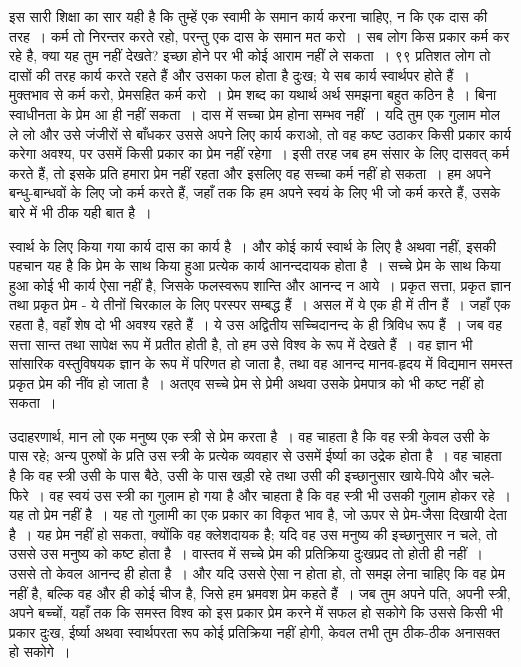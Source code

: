 इस सारी शिक्षा का सार यही है कि तुम्हें एक स्वामी के समान कार्य करना चाहिए, न कि एक दास की तरह~। कर्म तो निरन्तर करते रहो, परन्तु एक दास के समान मत करो~। सब लोग किस प्रकार कर्म कर रहे है, क्या यह तुम नहीं देखते? इच्छा होने पर भी कोई आराम नहीं ले सकता~। ९९ प्रतिशत लोग तो दासों की तरह कार्य करते रहते हैं और उसका फल होता है दुःख; ये सब कार्य स्वार्थपर होते हैं~। मुक्तभाव से कर्म करो, प्रेमसहित कर्म करो~। प्रेम शब्द का यथार्थ अर्थ समझना बहुत कठिन है~। बिना स्वाधीनता के प्रेम आ ही नहीं सकता~। दास में सच्चा प्रेम होना सम्भव नहीं~। यदि तुम एक गुलाम मोल ले लो और उसे जंजीरों से बाँधकर उससे अपने लिए कार्य कराओ, तो वह कष्ट उठाकर किसी प्रकार कार्य करेगा अवश्य, पर उसमें किसी प्रकार का प्रेम नहीं रहेगा~। इसी तरह जब हम संसार के लिए दासवत् कर्म करते हैं, तो इसके प्रति हमारा प्रेम नहीं रहता और इसलिए वह सच्चा कर्म नहीं हो सकता~। हम अपने बन्धु-बान्धवों के लिए जो कर्म करते हैं, जहाँ तक कि हम अपने स्वयं के लिए भी जो कर्म करते हैं, उसके बारे में भी ठीक यही बात है~।

स्वार्थ के लिए किया गया कार्य दास का कार्य है~। और कोई कार्य स्वार्थ के लिए है अथवा नहीं, इसकी पहचान यह है कि प्रेम के साथ किया हुआ प्रत्येक कार्य आनन्ददायक होता है~। सच्चे प्रेम के साथ किया हुआ कोई भी कार्य ऐसा नहीं है, जिसके फलस्वरूप शान्ति और आनन्द न आये~। प्रकृत सत्ता, प्रकृत ज्ञान तथा प्रकृत प्रेम - ये तीनों चिरकाल के लिए परस्पर सम्बद्ध हैं~। असल में ये एक ही में तीन हैं~। जहाँ एक रहता है, वहाँ शेष दो भी अवश्य रहते हैं~। ये उस अद्वितीय सच्चिदानन्द के ही त्रिविध रूप हैं~। जब वह सत्ता सान्त तथा सापेक्ष रूप में प्रतीत होती है, तो हम उसे विश्व के रूप में देखते हैं~। वह ज्ञान भी सांसारिक वस्तुविषयक ज्ञान के रूप में परिणत हो जाता है, तथा वह आनन्द मानव-हृदय में विद्यमान समस्त प्रकृत प्रेम की नींव हो जाता है~। अतएव सच्चे प्रेम से प्रेमी अथवा उसके प्रेमपात्र को भी कष्ट नहीं हो सकता~।

उदाहरणार्थ, मान लो एक मनुष्य एक स्त्री से प्रेम करता है~। वह चाहता है कि वह स्त्री केवल उसी के पास रहे; अन्य पुरुषों के प्रति उस स्त्री के प्रत्येक व्यवहार से उसमें ईर्ष्या का उद्रेक होता है~। वह चाहता है कि वह स्त्री उसी के पास बैठे, उसी के पास खड़ी रहे तथा उसी की इच्छानुसार खाये-पिये और चले-फिरे~। वह स्वयं उस स्त्री का गुलाम हो गया है और चाहता है कि वह स्त्री भी उसकी गुलाम होकर रहे~। यह तो प्रेम नहीं है~। यह तो गुलामी का एक प्रकार का विकृत भाव है, जो ऊपर से प्रेम-जैसा दिखायी देता है~। यह प्रेम नहीं हो सकता, क्योंकि वह क्लेशदायक है; यदि वह उस मनुष्य की इच्छानुसार न चले, तो उससे उस मनुष्य को कष्ट होता है~। वास्तव में सच्चे प्रेम की प्रतिक्रिया दुःखप्रद तो होती ही नहीं~। उससे तो केवल आनन्द ही होता है~। और यदि उससे ऐसा न होता हो, तो समझ लेना चाहिए कि वह प्रेम नहीं है, बल्कि वह और ही कोई चीज है, जिसे हम भ्रमवश प्रेम कहते हैं~। जब तुम अपने पति, अपनी स्त्री, अपने बच्चों, यहाँ तक कि समस्त विश्व को इस प्रकार प्रेम करने में सफल हो सकोगे कि उससे किसी भी प्रकार दुःख, ईर्ष्या अथवा स्वार्थपरता रूप कोई प्रतिक्रिया नहीं होगी, केवल तभी तुम ठीक-ठीक अनासक्त हो सकोगे~।

